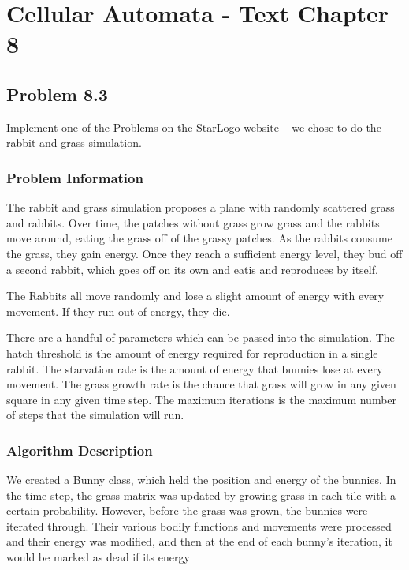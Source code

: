 
\chapter{Cellular Automata - Text Chapter 8}

\section{Problem 8.3}

Implement one of the Problems on the StarLogo website -- we chose to do the rabbit and grass simulation.

\subsection{Problem Information}

The rabbit and grass simulation proposes a plane with randomly scattered grass and rabbits.  Over time, the patches without grass grow grass and the rabbits move around, eating the grass off of the grassy patches.  As the rabbits consume the grass, they gain energy.  Once they reach a sufficient energy level, they bud off a second rabbit, which goes off on its own and eatis and reproduces by itself.

The Rabbits all move randomly and lose a slight amount of energy with every movement.  If they run out of energy, they die.

There are a handful of parameters which can be passed into the simulation.  The hatch threshold is the amount of energy required for reproduction in a single rabbit.  The starvation rate is the amount of energy that bunnies lose at every movement.  The grass growth rate is the chance that grass will grow in any given square in any given time step.  The maximum iterations is the maximum number of steps that the simulation will run.

\subsection{Algorithm Description}

We created a Bunny class, which held the position and energy of the bunnies.  In the time step, the grass matrix was updated by growing grass in each tile with a certain probability.  However, before the grass was grown, the bunnies were iterated through.  Their various bodily functions and movements were processed and their energy was modified, and then at the end of each bunny's iteration, it would be marked as dead if its energy

